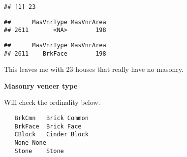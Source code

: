 \documentclass[]{article}
\newenvironment{Shaded}{\begin{snugshade}}{\end{snugshade}}
\newcommand{\KeywordTok}[1]{\textcolor[rgb]{0.13,0.29,0.53}{\textbf{#1}}}
\newcommand{\DecValTok}[1]{\textcolor[rgb]{0.00,0.00,0.81}{#1}}
\newcommand{\StringTok}[1]{\textcolor[rgb]{0.31,0.60,0.02}{#1}}
\newcommand{\CommentTok}[1]{\textcolor[rgb]{0.56,0.35,0.01}{\textit{#1}}}
\newcommand{\OperatorTok}[1]{\textcolor[rgb]{0.81,0.36,0.00}{\textbf{#1}}}
\newcommand{\NormalTok}[1]{#1}
\begin{document}
\begin{verbatim}
## [1] 23
\end{verbatim}

\begin{Shaded}
\end{Shaded}

\begin{verbatim}
##      MasVnrType MasVnrArea
## 2611       <NA>        198
\end{verbatim}

\begin{Shaded}
\end{Shaded}

\begin{verbatim}
##      MasVnrType MasVnrArea
## 2611    BrkFace        198
\end{verbatim}

This leaves me with 23 houses that really have no masonry.

\textbf{Masonry veneer type}

Will check the ordinality below.

\begin{verbatim}
   BrkCmn   Brick Common
   BrkFace  Brick Face
   CBlock   Cinder Block
   None None
   Stone    Stone
\end{verbatim}
\end{document}

